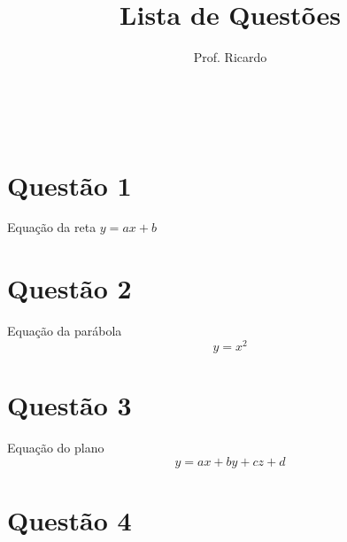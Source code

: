 \documentclass[a4paper,12pt]{article}
\title{Lista de Questões}
\author{Prof. Ricardo}
\date{} %
\begin{document}




\

\begin{multicols}{2}
\section*{Questão 1}
\lipsum[1]

\begin{center}
    Equação da reta $ y = ax+b $
\end{center}

\section*{Questão 2}
\lipsum[2]

\begin{center}
Equação da parábola $$ y=x^2 $$
\end{center}

\section*{Questão 3}
\lipsum[3]

\begin{center}
    Equação do plano \[ y=ax+by+cz+d \]
\end{center}

\section*{Questão 4}
\lipsum[4]

\end{multicols}
\end{document}
